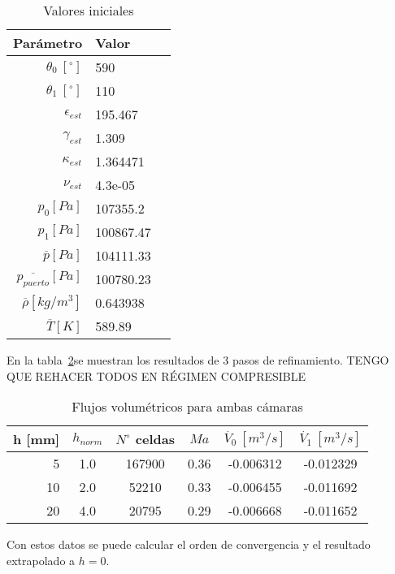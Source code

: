 \begin{table}
    \centering
    \begin{tabular}{rll}\toprule
        Parámetro & Valor \\ \midrule
        $\theta_0\ [^{\circ}]$ & 590 \\
        $\theta_1\ [^{\circ}]$ & 110 \\
        $\epsilon_{est}$ & 195.467 \\
        $\gamma_{est}$ & 1.309 \\
        $\kappa_{est}$ & 1.364471 \\
        $\nu_{est}$ & 4.3e-05 \\
        $p_0 [Pa]$ & 107355.2 \\
        $p_1 [Pa]$ & 100867.47 \\
        $\overline{p} [Pa]$ & 104111.33 \\
        $\overline{p_{puerto}} [Pa]$ & 100780.23 \\
        $\overline{\rho} [kg/m^3]$ & 0.643938 \\
        $\overline{T} [K]$ & 589.89 \\ \bottomrule
    \end{tabular}
    \caption{Valores iniciales}\label{tab:caso0_ci}
\end{table}


En la tabla~\ref{tab:res_caso0}se muestran los resultados de 3 pasos de
refinamiento. TENGO QUE REHACER TODOS EN RÉGIMEN COMPRESIBLE

\begin{table}
    \centering
    \begin{tabular}{rccccc}\toprule
        h [mm] & $h_{norm}$ & $N^{\circ}$ celdas & $Ma$ & $\dot{V_{0}}\ [m^3/s] $ & $\dot{V_{1}}\ [m^3/s]$ \\ \midrule
        5      & 1.0        & 167900             & 0.36 & -0.006312     & -0.012329 \\
        10     & 2.0        & 52210              & 0.33 & -0.006455     & -0.011692 \\
        20     & 4.0        & 20795              & 0.29 & -0.006668     & -0.011652 \\ \bottomrule
    \end{tabular}
    \caption{Flujos volumétricos para ambas cámaras}\label{tab:res_caso0}
\end{table}

Con estos datos se puede calcular el orden de convergencia y el resultado
extrapolado a $h=0$.

